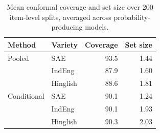 \begin{table}[t]
\centering
\caption{Mean conformal coverage and set size over 200 item-level splits, averaged across probability-producing models.}
\label{tab:conformal-summary}
\small
\begin{tabular}{llrr}
\toprule
Method & Variety & Coverage & Set size \\
\midrule
Pooled & SAE & 93.5 & 1.44 \\
 & IndEng & 87.9 & 1.60 \\
 & Hinglish & 88.6 & 1.81 \\
\addlinespace
Conditional & SAE & 90.1 & 1.24 \\
 & IndEng & 90.1 & 1.93 \\
 & Hinglish & 90.3 & 2.03 \\
\bottomrule
\end{tabular}
\end{table}

